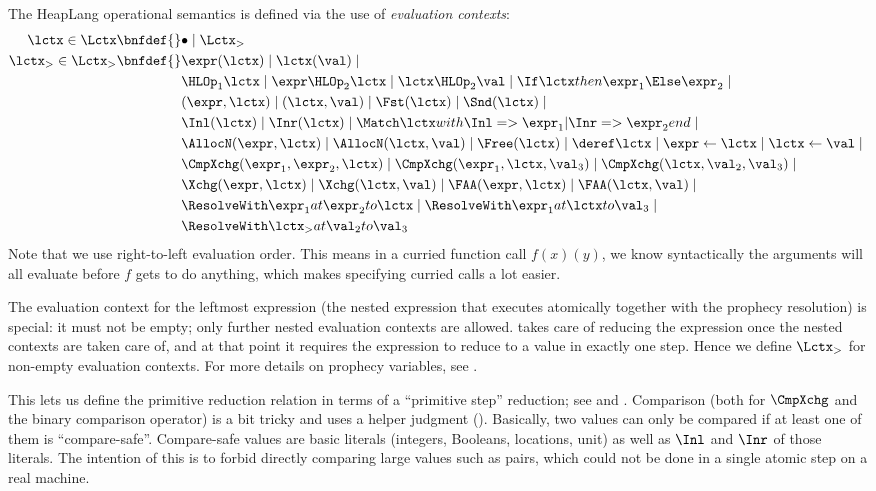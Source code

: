 The HeapLang operational semantics is defined via the use of \emph{evaluation contexts}:
\begin{align*}
\lctx \in \Lctx \bnfdef{}&
  \bullet \mid \Lctx_{>} \\
\lctx_{>} \in \Lctx_{>} \bnfdef{}&
  \expr(\lctx) \mid
  \lctx (\val) \mid
  {}\\ &
  \HLOp_1 \lctx \mid
  \expr \HLOp_2 \lctx \mid
  \lctx \HLOp_2 \val \mid
  \If \lctx then \expr_1 \Else \expr_2 \mid
  {}\\ &
  (\expr, \lctx) \mid
  (\lctx, \val) \mid
  \Fst(\lctx) \mid
  \Snd(\lctx) \mid
  {}\\ &
  \Inl(\lctx) \mid
  \Inr(\lctx) \mid
  \Match \lctx with \Inl => \expr_1 | \Inr => \expr_2 end \mid
  {}\\ &
  \AllocN(\expr, \lctx) \mid
  \AllocN(\lctx, \val) \mid
  \Free(\lctx) \mid
  \deref \lctx \mid
  \expr \gets \lctx \mid
  \lctx \gets \val \mid
  {}\\ &
  \CmpXchg(\expr_1, \expr_2, \lctx) \mid
  \CmpXchg(\expr_1, \lctx, \val_3) \mid
  \CmpXchg(\lctx, \val_2, \val_3) \mid
  {}\\ &
  \Xchg(\expr, \lctx) \mid
  \Xchg(\lctx, \val) \mid
  \FAA(\expr, \lctx) \mid
  \FAA(\lctx, \val) \mid
  {}\\ &
  \ResolveWith \expr_1 at \expr_2 to \lctx \mid
  \ResolveWith \expr_1 at \lctx to \val_3 \mid
  {}\\ &
  \ResolveWith \lctx_{>} at \val_2 to \val_3
\end{align*}
Note that we use right-to-left evaluation order.
This means in a curried function call $f(x)(y)$, we know syntactically the arguments will all evaluate before $f$ gets to do anything, which makes specifying curried calls a lot easier.

The  evaluation context for the leftmost expression (the nested expression that executes atomically together with the prophecy resolution) is special: it must not be empty; only further nested evaluation contexts are allowed.
 takes care of reducing the expression once the nested contexts are taken care of, and at that point it requires the expression to reduce to a value in exactly one step.
Hence we define $\Lctx_{>}$ for non-empty evaluation contexts.
For more details on prophecy variables, see \cite{iris:prophecy}.

This lets us define the primitive reduction relation in terms of a ``primitive step'' reduction; see  and .
Comparison (both for $\CmpXchg$ and the binary comparison operator) is a bit tricky and uses a helper judgment ().
Basically, two values can only be compared if at least one of them is ``compare-safe''.
Compare-safe values are basic literals (integers, Booleans, locations, unit) as well as $\Inl$ and $\Inr$ of those literals.
The intention of this is to forbid directly comparing large values such as pairs, which could not be done in a single atomic step on a real machine.


